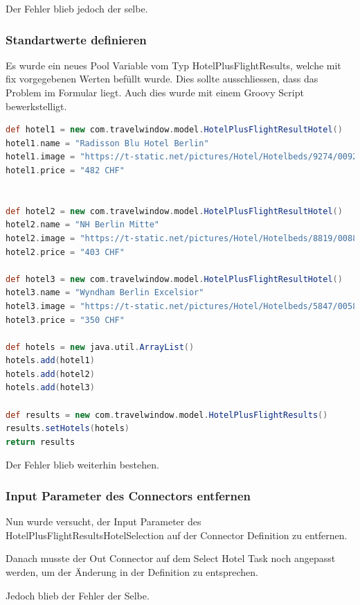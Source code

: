 Der Fehler blieb jedoch der selbe.

\subsubsection{Standartwerte definieren}
Es wurde ein neues Pool Variable vom Typ  HotelPlusFlightResults, welche mit fix vorgegebenen Werten befüllt wurde. Dies sollte ausschliessen, dass das Problem im Formular liegt. Auch dies wurde mit einem Groovy Script bewerkstelligt.

\begin{lstlisting}[language=Groovy,firstnumber=1]
def hotel1 = new com.travelwindow.model.HotelPlusFlightResultHotel()
hotel1.name = "Radisson Blu Hotel Berlin"
hotel1.image = "https://t-static.net/pictures/Hotel/Hotelbeds/9274/009274a_hb_ba_003.jpg?width=240&height=180&scale=both&mode=crop"
hotel1.price = "482 CHF"


def hotel2 = new com.travelwindow.model.HotelPlusFlightResultHotel()
hotel2.name = "NH Berlin Mitte"
hotel2.image = "https://t-static.net/pictures/Hotel/Hotelbeds/8819/008819a_hb_ba_008.jpg?width=240&height=180&scale=both&mode=crop"
hotel2.price = "403 CHF"

def hotel3 = new com.travelwindow.model.HotelPlusFlightResultHotel()
hotel3.name = "Wyndham Berlin Excelsior"
hotel3.image = "https://t-static.net/pictures/Hotel/Hotelbeds/5847/005847a_hb_l_010.jpg?width=240&height=180&scale=both&mode=crop"
hotel3.price = "350 CHF"

def hotels = new java.util.ArrayList()
hotels.add(hotel1)
hotels.add(hotel2)
hotels.add(hotel3)

def results = new com.travelwindow.model.HotelPlusFlightResults()
results.setHotels(hotels)
return results
\end{lstlisting}

Der Fehler blieb weiterhin bestehen.

\subsubsection{Input Parameter des Connectors entfernen}
Nun wurde versucht, der Input Parameter des HotelPlusFlightResultsHotelSelection auf der Connector Definition zu entfernen.

Danach musste der Out Connector auf dem Select Hotel Task noch angepasst werden, um der Änderung in der Definition zu entsprechen.

Jedoch blieb der Fehler der Selbe.

